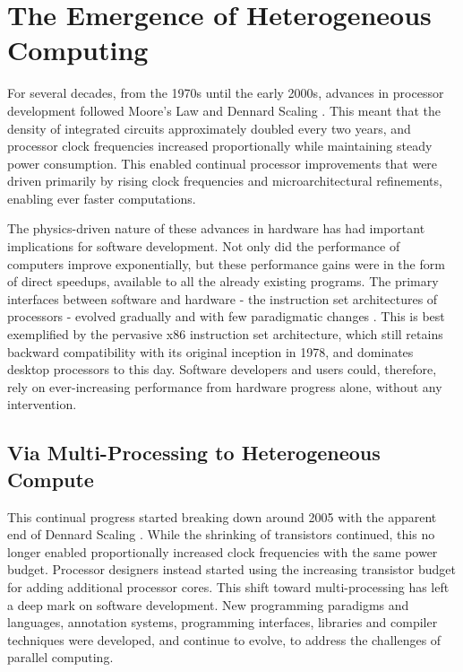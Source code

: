 \section{The Emergence of Heterogeneous Computing}

    For several decades, from the 1970s until the early 2000s, advances in
    processor development followed Moore's Law \citep{4785860} and
    Dennard Scaling \citep{1050511}.
    This meant that the density of integrated circuits approximately doubled
    every two years, and processor clock frequencies increased proportionally
    while maintaining steady power consumption.
    This enabled continual processor improvements that were driven primarily by
    rising clock frequencies and microarchitectural refinements, enabling ever
    faster computations.

    The physics-driven nature \citep{Hutcheson2018Moore} of these advances in
    hardware has had important implications for software development.
    Not only did the performance of computers improve exponentially, but these
    performance gains were in the form of direct speedups, available to all the
    already existing programs.
    The primary interfaces between software and hardware - the instruction set
    architectures of processors - evolved gradually and with few
    paradigmatic changes \citep{8310168}.
    This is best exemplified by the pervasive x86 instruction set architecture,
    which still retains backward compatibility with its original inception in
    1978, and dominates desktop processors to this day.
    Software developers and users could, therefore, rely on ever-increasing
    performance from hardware progress alone, without any intervention.

\subsection{Via Multi-Processing to Heterogeneous Compute}

    This continual progress started breaking down around 2005 with the apparent
    end of Dennard Scaling \citep{6307773}.
    While the shrinking of transistors continued, this no longer enabled
    proportionally increased clock frequencies with the same power budget.
    Processor designers instead started using the increasing transistor
    budget for adding additional processor cores.
    This shift toward multi-processing has left a deep mark on software
    development.
    New programming paradigms and languages, annotation systems, programming
    interfaces, libraries and compiler techniques were developed, and continue
    to evolve, to address the challenges of parallel computing.

